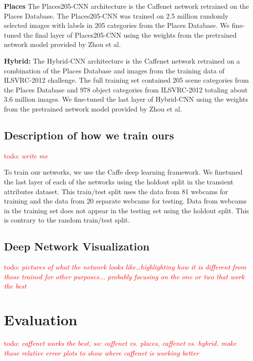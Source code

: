 \documentclass{article}
\newcommand{\todo}[1]{\textcolor{red}{todo: {\em #1}}}
\begin{document}
\textbf{Places} The Places205-CNN architecture is the Caffenet network retrained on 
the Places Database\cite{zhou2014places}.  The Places205-CNN was trained on 2.5
million randomly selected images with labels in 205 categories from the Places 
Database.  We fine-tuned the final layer of Places205-CNN using the weights from the
pretrained network model provided by Zhou\cite{zhou2014places} et al.

\textbf{Hybrid:} The Hybrid-CNN architecture is the Caffenet network retrained on
a combination of the Places Database\cite{zhou2014places} and images from the 
training data of ILSVRC-2012\cite{ILSVRCarxiv14} challenge.  The full training set
contained 205 scene categories from the Places Database and 978 object categories
from ILSVRC-2012 totaling about 3.6 million images.  We fine-tuned the last 
layer of Hybrid-CNN using the weights from the pretrained network model provided by 
Zhou\cite{zhou2014places} et al.

\subsection{Description of how we train ours}

\todo{write me} 

To train our networks, we use the Caffe\cite{caffe14} deep learning 
framework. We finetuned the last layer of each of the networks using the 
holdout split in the transient attributes dataset.  This train/test split uses
the data from 81 webcams for training and the data from 20 separate 
webcams for testing.  Data from webcams in the training set does not
appear in the testing set using the holdout split.  This is contrary to 
the random train/test split.  

\subsection{Deep Network Visualization}

\todo{pictures of what the network looks like\dots highlighting how it
is different from those trained for other purposes... probably
focusing on the one or two that work the best}

\section{Evaluation}

\todo{caffenet works the best, so: caffenet vs. places, caffenet vs. hybrid.
			make those relative error plots to show where caffenet is working better}
\end{document}
